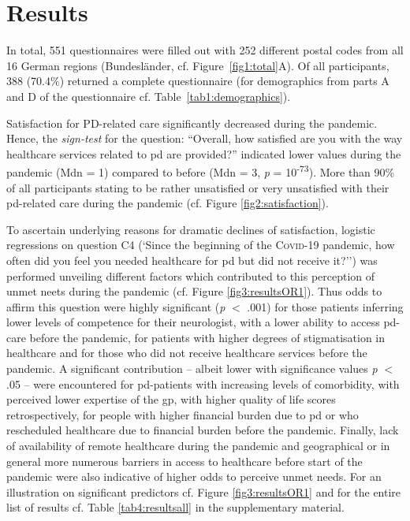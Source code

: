 \documentclass{bmcart}
\begin{document}
\newpage

\section*{Results}
In total, 551 questionnaires were filled out with 252 different postal codes from all 16 German regions (Bundesländer, cf. Figure~\ref{fig1:total}A). Of all participants, 388 (70.4$\%$) returned a complete questionnaire (for demographics from parts A and D of the questionnaire cf. Table~\ref{tab1:demographics}). 

Satisfaction for PD-related care significantly decreased during the pandemic. Hence, the \textit{sign-test} for the question: ``Overall, how satisfied are you with the way healthcare services related to \acl{pd} are provided?'' indicated lower values during the pandemic (Mdn = 1) compared to before (Mdn = 3, \textit{p} = 10\textsuperscript{-73}). More than 90\% of all participants stating to be rather unsatisfied or very unsatisfied with their \ac{pd}-related care during the pandemic (cf. Figure \ref{fig2:satisfaction}). 

To ascertain underlying reasons for dramatic declines of satisfaction, logistic regressions on question C4 (`Since the beginning of the \textsc{Covid}-19 pandemic, how often did you feel you needed healthcare for \acl{pd} but did not receive it?'') was performed unveiling different factors which contributed to this perception of unmet neets during the pandemic (cf. Figure \ref{fig3:resultsOR1}). Thus odds to affirm this question were highly significant (\textit{p} $<$ .001) for those patients inferring lower levels of competence for their neurologist, with a lower ability to access \ac{pd}-care before the pandemic, for patients with higher degrees of stigmatisation in healthcare and for those who did not receive healthcare services before the pandemic. A significant contribution -- albeit lower with significance values \textit{p} $<$ .05 --  were encountered for \ac{pd}-patients with increasing levels of comorbidity, with perceived lower expertise of the \ac{gp}, with higher quality of life scores retrospectively, for people with higher financial burden due to \ac{pd} or who rescheduled healthcare due to financial burden before the pandemic. Finally, lack of availability of remote healthcare during the pandemic and geographical or in general more numerous barriers in access to healthcare before start of the pandemic were also indicative of higher odds to perceive unmet needs. For an illustration on significant predictors cf. Figure \ref{fig3:resultsOR1} and for the entire list of results cf. Table  \ref{tab4:resultsall} in the supplementary material. 
\end{document}
